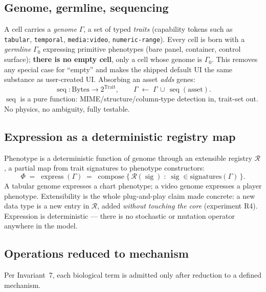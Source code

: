 \documentclass[11pt]{article}
\DeclareMathOperator{\express}{express}
\DeclareMathOperator{\seq}{seq}
\DeclareMathOperator{\sig}{sig}
\DeclareMathOperator{\compose}{compose}
\newcommand{\R}{\mathcal{R}}
\newcommand{\Gnome}{\Gamma}
\newcommand{\Phe}{\Phi}
\begin{document}
\subsection{Genome, germline, sequencing}
A cell carries a \emph{genome} $\Gnome$, a set of typed \emph{traits} (capability tokens such as
\texttt{tabular}, \texttt{temporal}, \texttt{media:video}, \texttt{numeric-range}). Every cell
is born with a \emph{germline} $\Gnome_0$ expressing primitive phenotypes (bare panel, container,
control surface); \textbf{there is no empty cell}, only a cell whose genome is $\Gnome_0$. This
removes any special case for ``empty'' and makes the shipped default UI the same substance as
user-created UI. Absorbing an asset \emph{adds} genes:
\begin{equation}
\seq : \text{Bytes} \to 2^{\text{Trait}}, \qquad
\Gnome \;\gets\; \Gnome \,\cup\, \seq(\text{asset}).
\end{equation}
$\seq$ is a pure function: MIME/structure/column-type detection in, trait-set out. No physics,
no ambiguity, fully testable.

\subsection{Expression as a deterministic registry map}
Phenotype is a deterministic function of genome through an extensible registry $\R$, a
partial map from trait signatures to phenotype constructors:
\begin{equation}
\Phe \;=\; \express(\Gnome) \;=\; \compose\big\{\,\R(\sig)\;:\;\sig\in\text{signatures}(\Gnome)\,\big\}.
\end{equation}
A tabular genome expresses a chart phenotype; a video genome expresses a player phenotype.
Extensibility is the whole plug-and-play claim made concrete: a new data type is a new entry in
$\R$, added \emph{without touching the core} (experiment R4). Expression is deterministic ---
there is no stochastic or mutation operator anywhere in the model.

\subsection{Operations reduced to mechanism}
Per Invariant~7, each biological term is admitted only after reduction to a defined mechanism.
\end{document}
